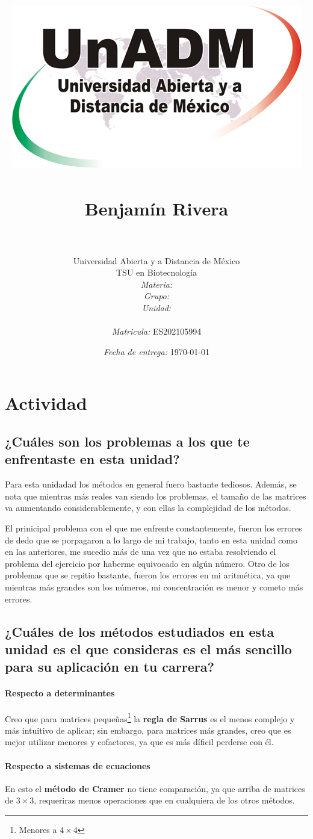 \documentclass[12pt]{article}
\title{
	\includegraphics{../../../assets/logo-unadm} \\
	\ \\ Benjam\'in Rivera \\
	\bf{\titulo}\\}
\author{
	Universidad Abierta y a Distancia de México \\
	TSU en Biotecnolog\'ia \\
	\textit{Materia:} \materia \\
	\textit{Grupo:} \grupo \\
	\textit{Unidad:} \unidad \\
	\\
	\textit{Matricula:} ES202105994 }
\date{\textit{Fecha de entrega:} \today}
\begin{document}
\maketitle
\noindent\makebox[\linewidth]{\rule{\paperwidth}{0.4pt}}

\section{Actividad}

\subsection{¿Cuáles son los problemas a los que te enfrentaste en esta unidad?}

	\par Para esta unidadad los métodos en general fuero bastante tediosos. Además, se nota que mientras más reales van siendo los problemas, el tamaño de las matrices va aumentando considerablemente, y con ellas la complejidad de los métodos.

	\par El prinicipal problema con el que me enfrente constantemente, fueron los errores de dedo que se porpagaron a lo largo de mi trabajo, tanto en esta unidad como en las anteriores, me sucedio más de una vez que no estaba resolviendo el problema del ejercicio por haberme equivocado en algún número. Otro de los problemas que se repitio bastante, fueron los errores en mi aritmética, ya que mientras más grandes son los números, mi concentración es menor y cometo más errores.
	
	
\subsection{¿Cuáles de los métodos estudiados en esta unidad es el que consideras es el más sencillo para su aplicación en tu carrera? }

\paragraph{Respecto a determinantes}
	\par Creo que para matrices pequeñas\footnote{Menores a $4 \times 4$} la \textbf{regla de Sarrus} es el menos complejo y más intuitivo de aplicar; sin embargo, para matrices más grandes, creo que es mejor utilizar menores y cofactores, ya que es más díficil perderse con él.

\paragraph{Respecto a sistemas de ecuaciones} En esto el \textbf{método de Cramer} no tiene comparación, ya que arriba de matrices de $3 \times 3$, requeriras menos operaciones que en cualquiera de los otros métodos.
\end{document}

